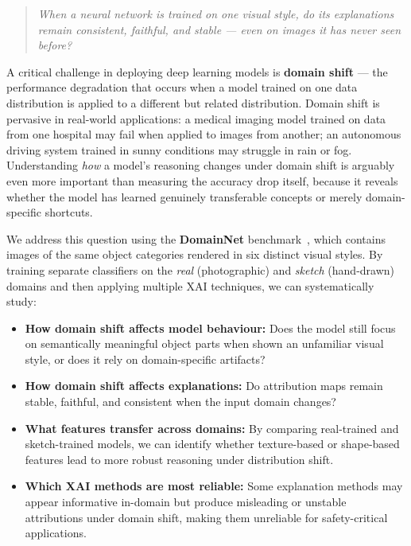 \documentclass[12pt, a4paper]{article}
\begin{document}
\begin{quote}
\emph{When a neural network is trained on one visual style, do its explanations
remain consistent, faithful, and stable --- even on images it has never seen
before?}
\end{quote}

A critical challenge in deploying deep learning models is \textbf{domain shift}
--- the performance degradation that occurs when a model trained on one data
distribution is applied to a different but related distribution.  Domain shift
is pervasive in real-world applications: a medical imaging model trained on data
from one hospital may fail when applied to images from another; an autonomous
driving system trained in sunny conditions may struggle in rain or fog.
Understanding \emph{how} a model's reasoning changes under domain shift is
arguably even more important than measuring the accuracy drop itself, because it
reveals whether the model has learned genuinely transferable concepts or merely
domain-specific shortcuts.

We address this question using the \textbf{DomainNet} benchmark~\cite{domainnet},
which contains images of the same object categories rendered in six distinct
visual styles.  By training separate classifiers on the \textit{real}
(photographic) and \textit{sketch} (hand-drawn) domains and then applying
multiple XAI techniques, we can systematically study:

\begin{itemize}[leftmargin=*]
    \item \textbf{How domain shift affects model behaviour:} Does the model
          still focus on semantically meaningful object parts when shown an
          unfamiliar visual style, or does it rely on domain-specific artifacts?
    \item \textbf{How domain shift affects explanations:} Do attribution maps
          remain stable, faithful, and consistent when the input domain changes?
    \item \textbf{What features transfer across domains:} By comparing
          real-trained and sketch-trained models, we can identify whether
          texture-based or shape-based features lead to more robust reasoning
          under distribution shift.
    \item \textbf{Which XAI methods are most reliable:} Some explanation methods
          may appear informative in-domain but produce misleading or unstable
          attributions under domain shift, making them unreliable for safety-critical
          applications.
\end{itemize}
\end{document}
